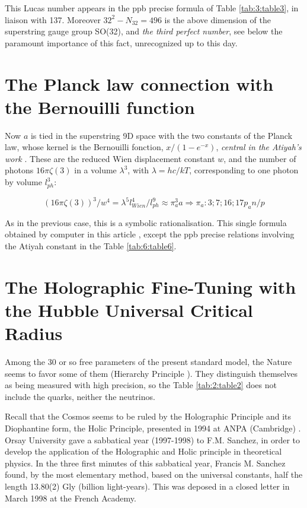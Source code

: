 \documentclass[a4paper,9pt]{article}
\begin{document}
This Lucas number appears in the ppb precise formula of Table \ref{tab:3:table3}, in liaison with 137. Moreover $32^2 - N_{32} =  496$ is the above dimension of the superstring gauge group SO(32), and \textit {the third perfect number}, see below the paramount importance of this fact, unrecognized up to this day.









\section{The Planck law connection with the Bernouilli function}

Now $a$ is tied in the superstring 9D space with the two constants of the Planck law, whose kernel is the Bernouilli fonction, $x/(1-e^{-x})$, \textit {central in the Atiyah's work} \cite{Atiyah}. These are the reduced Wien displacement constant $w$, and the number of photons $16\pi \zeta(3)$ in a volume $\lambda^3$, with $\lambda = hc/kT $, corresponding to one photon by volume $l_{ph}^3$:

\begin{equation}
(16\pi\zeta(3))^3/w^4 = \lambda^5l_{Wien}^4/l_{ph}^9 \approx \pi_a^3a    \Rightarrow     \pi_a: 3;7;16;17p_an/p
\end{equation}

As in the previous case, this is a symbolic rationalisation. This single formula obtained by computer in this article \cite{LaGuer}, except the ppb precise relations involving the Atiyah constant in the Table \ref{tab:6:table6}.








\section{The Holographic Fine-Tuning with the Hubble Universal Critical Radius}

Among the 30 or so free parameters of the present standard model, the Nature seems to favor some of them (Hierarchy Principle \cite{Sanchez}). They distinguish themselves as being measured with high precision, so the Table \ref{tab:2:table2} does not include the quarks, neither the neutrinos. 

Recall that the Cosmos seems to be ruled by the Holographic Principle and its Diophantine form, the Holic Principle, presented in 1994 at ANPA (Cambridge)  \cite{Sanchez1}. Orsay University gave a sabbatical year (1997-1998) to F.M. Sanchez, in order to develop the application of the Holographic and Holic principle in theoretical physics. In the three first minutes of this sabbatical year, Francis M. Sanchez found, by the most elementary method, based on the universal constants, half the length 13.80(2) Gly (billion light-years). This was deposed in a closed letter in March 1998 at the French Academy. 
\end{document}
